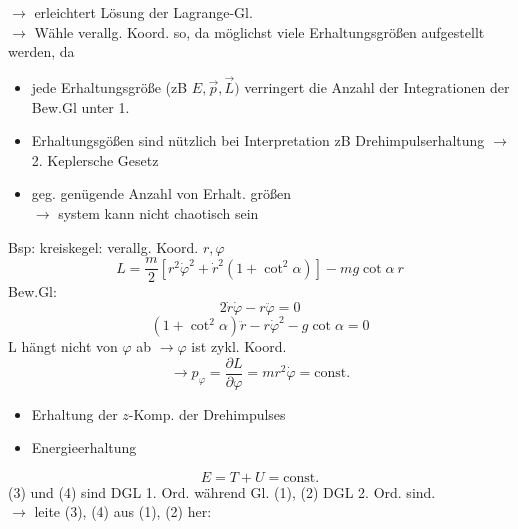 \documentclass[titlepage,12pt,a4paper,ngerman]{report}
\newcommand{\tx}[1]{\textrm{#1}}
\newcommand{\const}{\tx{const.}}
\begin{document}
$\rightarrow$ erleichtert Lösung der Lagrange-Gl.\\
$\rightarrow$ Wähle verallg. Koord. so, da möglichst viele Erhaltungsgrößen aufgestellt werden, da 
\begin{itemize}
	\item jede Erhaltungsgröße (zB $E, \vec{p},\vec{L})$ verringert die Anzahl der Integrationen der Bew.Gl unter 1.
	\item Erhaltungsgößen sind nützlich bei Interpretation zB Drehimpulserhaltung $\rightarrow$ 2. Keplersche Gesetz
	\item geg. genügende Anzahl von Erhalt. größen\\
	$\rightarrow$ system kann nicht chaotisch sein
\end{itemize}
Bsp: kreiskegel: verallg. Koord. $r, \varphi$ %
$$L = \frac{m}{2} [r^2 \dot \varphi^2 + \dot r^2 ( 1+ \cot^2 \alpha)] - mg \cot \alpha\ r$$
Bew.Gl: 
\begin{equation*}
2 \dot r \dot \varphi - r \ddot \varphi = 0 \tag{1}
\end{equation*}
\begin{equation*}
(1+ \cot^2 \alpha) \ddot r - r \dot \varphi^2 - g \cot \alpha = 0 \tag{2}
\end{equation*}
L hängt nicht von $\varphi$ ab $\rightarrow \varphi$ ist zykl. Koord.\\
\begin{equation*}
\rightarrow p_\varphi = \frac{\partial L }{\partial \varphi} = m r^2 \dot \varphi = \const \tag{3}
\end{equation*}
\begin{itemize}
	\item Erhaltung der $z$-Komp. der Drehimpulses
	\item Energieerhaltung
\end{itemize} 
\begin{equation*}
E = T + U = \tx{const.} \tag{4}
\end{equation*}
(3) und (4) sind DGL 1. Ord. während Gl. (1), (2) DGL 2. Ord. sind.\\
$\rightarrow$ leite (3), (4) aus (1), (2) her:
\end{document}
